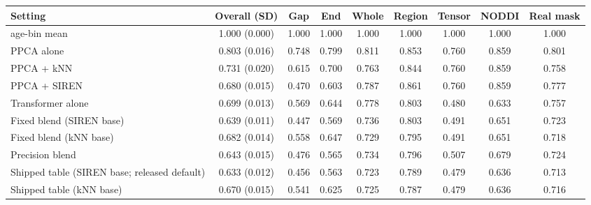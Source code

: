 \begin{tabular}{lcccccccc}
\toprule
Setting & Overall (SD) & Gap & End & Whole & Region & Tensor & NODDI & Real mask \\
\midrule
age-bin mean & 1.000 (0.000) & 1.000 & 1.000 & 1.000 & 1.000 & 1.000 & 1.000 & 1.000 \\
PPCA alone & 0.803 (0.016) & 0.748 & 0.799 & 0.811 & 0.853 & 0.760 & 0.859 & 0.801 \\
PPCA + kNN & 0.731 (0.020) & 0.615 & 0.700 & 0.763 & 0.844 & 0.760 & 0.859 & 0.758 \\
PPCA + SIREN & 0.680 (0.015) & 0.470 & 0.603 & 0.787 & 0.861 & 0.760 & 0.859 & 0.777 \\
Transformer alone & 0.699 (0.013) & 0.569 & 0.644 & 0.778 & 0.803 & 0.480 & 0.633 & 0.757 \\
Fixed blend (SIREN base) & 0.639 (0.011) & 0.447 & 0.569 & 0.736 & 0.803 & 0.491 & 0.651 & 0.723 \\
Fixed blend (kNN base) & 0.682 (0.014) & 0.558 & 0.647 & 0.729 & 0.795 & 0.491 & 0.651 & 0.718 \\
Precision blend & 0.643 (0.015) & 0.476 & 0.565 & 0.734 & 0.796 & 0.507 & 0.679 & 0.724 \\
Shipped table (SIREN base; released default) & 0.633 (0.012) & 0.456 & 0.563 & 0.723 & 0.789 & 0.479 & 0.636 & 0.713 \\
Shipped table (kNN base) & 0.670 (0.015) & 0.541 & 0.625 & 0.725 & 0.787 & 0.479 & 0.636 & 0.716 \\
\bottomrule
\end{tabular}
